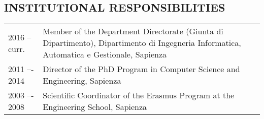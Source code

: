 \vspace{-2ex}
\subsection*{INSTITUTIONAL RESPONSIBILITIES}
\vspace{-2ex}
\begin{tabular}{p{2cm}p{14cm}}
2016 -- curr. & Member of the Department Directorate (Giunta di Dipartimento), Dipartimento di Ingegneria Informatica, Automatica e Gestionale, Sapienza\\
2011 –- 2014 & Director of the PhD Program in Computer Science and Engineering, Sapienza\\
2003 –- 2008 & Scientific Coordinator of the  Erasmus Program at the Engineering School, Sapienza
\end{tabular}

\vspace{-2ex}
